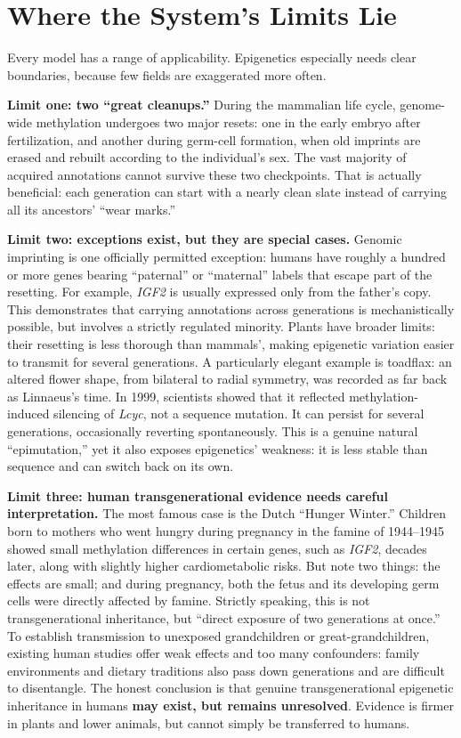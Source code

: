 \section{Where the System's Limits Lie}

Every model has a range of applicability. Epigenetics especially needs clear boundaries, because few fields are exaggerated more often.

\textbf{Limit one: two ``great cleanups.''} During the mammalian life cycle, genome-wide methylation undergoes two major resets: one in the early embryo after fertilization, and another during germ-cell formation, when old imprints are erased and rebuilt according to the individual's sex. The vast majority of acquired annotations cannot survive these two checkpoints. That is actually beneficial: each generation can start with a nearly clean slate instead of carrying all its ancestors' ``wear marks.''

\textbf{Limit two: exceptions exist, but they are special cases.} Genomic imprinting is one officially permitted exception: humans have roughly a hundred or more genes bearing ``paternal'' or ``maternal'' labels that escape part of the resetting. For example, \emph{IGF2} is usually expressed only from the father's copy. This demonstrates that carrying annotations across generations is mechanistically possible, but involves a strictly regulated minority. Plants have broader limits: their resetting is less thorough than mammals', making epigenetic variation easier to transmit for several generations. A particularly elegant example is toadflax: an altered flower shape, from bilateral to radial symmetry, was recorded as far back as Linnaeus's time. In 1999, scientists showed that it reflected methylation-induced silencing of \emph{Lcyc}, not a sequence mutation. It can persist for several generations, occasionally reverting spontaneously. This is a genuine natural ``epimutation,'' yet it also exposes epigenetics' weakness: it is less stable than sequence and can switch back on its own.

\textbf{Limit three: human transgenerational evidence needs careful interpretation.} The most famous case is the Dutch ``Hunger Winter.'' Children born to mothers who went hungry during pregnancy in the famine of 1944--1945 showed small methylation differences in certain genes, such as \emph{IGF2}, decades later, along with slightly higher cardiometabolic risks. But note two things: the effects are small; and during pregnancy, both the fetus and its developing germ cells were directly affected by famine. Strictly speaking, this is not transgenerational inheritance, but ``direct exposure of two generations at once.'' To establish transmission to unexposed grandchildren or great-grandchildren, existing human studies offer weak effects and too many confounders: family environments and dietary traditions also pass down generations and are difficult to disentangle. The honest conclusion is that genuine transgenerational epigenetic inheritance in humans \textbf{may exist, but remains unresolved}. Evidence is firmer in plants and lower animals, but cannot simply be transferred to humans.

